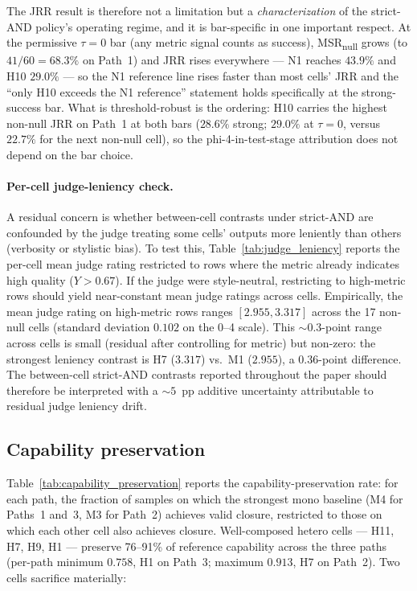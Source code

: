 The JRR result is therefore not a limitation but a \emph{characterization} of the strict-AND policy's operating regime, and it is bar-specific in one important respect. At the permissive $\tau = 0$ bar (any metric signal counts as success), MSR\textsubscript{null} grows (to $41/60 = 68.3\%$ on Path~1) and JRR rises everywhere --- N1 reaches $43.9\%$ and H10 $29.0\%$ --- so the N1 reference line rises faster than most cells' JRR and the ``only H10 exceeds the N1 reference'' statement holds specifically at the strong-success bar. What is threshold-robust is the ordering: H10 carries the highest non-null JRR on Path~1 at both bars ($28.6\%$ strong; $29.0\%$ at $\tau = 0$, versus $22.7\%$ for the next non-null cell), so the phi-4-in-test-stage attribution does not depend on the bar choice.

\paragraph{Per-cell judge-leniency check.} A residual concern is whether between-cell contrasts under strict-AND are confounded by the judge treating some cells' outputs more leniently than others (verbosity or stylistic bias). To test this, Table~\ref{tab:judge_leniency} reports the per-cell mean judge rating restricted to rows where the metric already indicates high quality ($Y > 0.67$). If the judge were style-neutral, restricting to high-metric rows should yield near-constant mean judge ratings across cells. Empirically, the mean judge rating on high-metric rows ranges $[2.955, 3.317]$ across the 17 non-null cells (standard deviation $0.102$ on the 0--4 scale). This $\sim$$0.3$-point range across cells is small (residual after controlling for metric) but non-zero: the strongest leniency contrast is H7 ($3.317$) vs.\ M1 ($2.955$), a $0.36$-point difference. The between-cell strict-AND contrasts reported throughout the paper should therefore be interpreted with a $\sim$$5$~pp additive uncertainty attributable to residual judge leniency drift.



\subsection{Capability preservation}
\label{sec:discussion_capability}



Table~\ref{tab:capability_preservation} reports the capability-preservation rate: for each path, the fraction of samples on which the strongest mono baseline (M4 for Paths~1 and~3, M3 for Path~2) achieves valid closure, restricted to those on which each other cell also achieves closure. Well-composed hetero cells --- H11, H7, H9, H1 --- preserve 76--91\% of reference capability across the three paths (per-path minimum $0.758$, H1 on Path~3; maximum $0.913$, H7 on Path~2). Two cells sacrifice materially:

